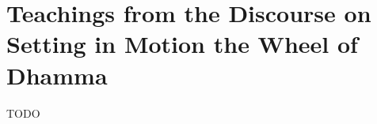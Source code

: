 %
%
%
%
%
%
%
%
%
%
%
%
%
%
%
%
%
%
%
%
%
%
%
%
%
\chapter{Teachings from the Discourse on Setting in Motion the Wheel of Dhamma}%

\begin{leader}
\end{leader}

TODO

